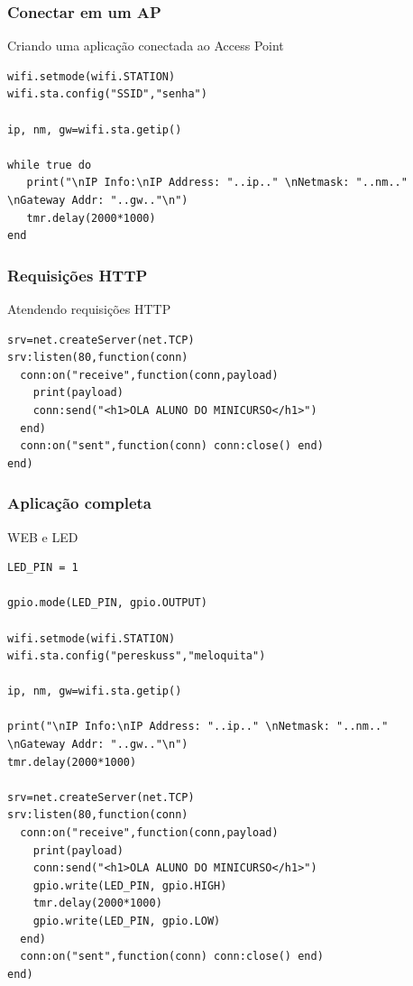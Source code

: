 \documentclass{beamer}
\begin{document}
\begin{frame}[fragile]
\frametitle{Conectar em um AP}

Criando uma aplicação conectada ao Access Point

\tiny
\begin{lstlisting}
wifi.setmode(wifi.STATION)
wifi.sta.config("SSID","senha")

ip, nm, gw=wifi.sta.getip()

while true do
   print("\nIP Info:\nIP Address: "..ip.." \nNetmask: "..nm.." 
\nGateway Addr: "..gw.."\n")
   tmr.delay(2000*1000)
end
\end{lstlisting}
\end{frame}

\begin{frame}[fragile]
\frametitle{Requisições HTTP}

Atendendo requisições HTTP

\tiny
\begin{lstlisting}
srv=net.createServer(net.TCP)
srv:listen(80,function(conn)
  conn:on("receive",function(conn,payload)
    print(payload)
    conn:send("<h1>OLA ALUNO DO MINICURSO</h1>")
  end)
  conn:on("sent",function(conn) conn:close() end)
end)

\end{lstlisting}
\end{frame}


\begin{frame}[fragile]
\frametitle{Aplicação completa}

WEB e LED
\tiny
\begin{lstlisting}
LED_PIN = 1

gpio.mode(LED_PIN, gpio.OUTPUT)

wifi.setmode(wifi.STATION)
wifi.sta.config("pereskuss","meloquita")

ip, nm, gw=wifi.sta.getip()

print("\nIP Info:\nIP Address: "..ip.." \nNetmask: "..nm.." 
\nGateway Addr: "..gw.."\n")
tmr.delay(2000*1000)

srv=net.createServer(net.TCP)
srv:listen(80,function(conn)
  conn:on("receive",function(conn,payload)
    print(payload)
    conn:send("<h1>OLA ALUNO DO MINICURSO</h1>")
    gpio.write(LED_PIN, gpio.HIGH)
    tmr.delay(2000*1000)
    gpio.write(LED_PIN, gpio.LOW)
  end)
  conn:on("sent",function(conn) conn:close() end)
end)
\end{lstlisting}

\end{frame}
\end{document}
